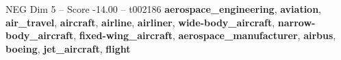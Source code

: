 \begin{textsample}{NEG Dim 5 – Score -14.00 – t002186}  \label{ex:f5_neg_024}
\textbf{aerospace\_engineering}, \textbf{aviation}, \textbf{air\_travel}, \textbf{aircraft}, \textbf{airline}, \textbf{airliner}, \textbf{wide-body\_aircraft}, \textbf{narrow-body\_aircraft}, \textbf{fixed-wing\_aircraft}, \textbf{aerospace\_manufacturer}, \textbf{airbus}, \textbf{boeing}, \textbf{jet\_aircraft}, \textbf{flight}

\end{textsample}
